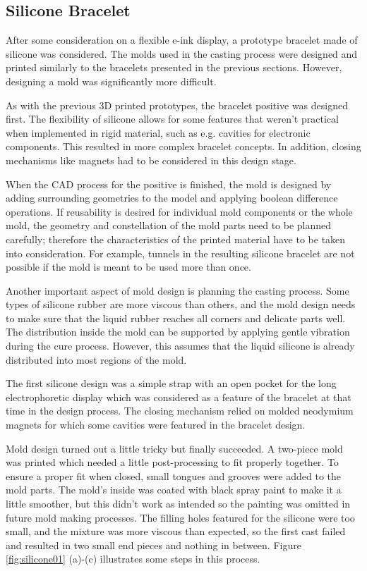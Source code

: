 \subsection{Silicone Bracelet}
After some consideration on a flexible e-ink display, a prototype brace\-let made of silicone was considered. The molds used in the casting process were designed and printed similarly to the bracelets presented in the previous sections. However, designing a mold was significantly more difficult.

As with the previous 3D printed prototypes, the bracelet positive was designed first. The flexibility of silicone allows for some features that weren't practical when implemented in rigid material, such as e.g. cavities for electronic components. This resulted in more complex bracelet concepts. In addition, closing mechanisms like magnets had to be considered in this design stage.

When the \ac{CAD} process for the positive is finished, the mold is designed by adding surrounding geometries to the model and applying boolean difference operations. If reusability is desired for individual mold components or the whole mold, the geometry and constellation of the mold parts need to be planned carefully; therefore the characteristics of the printed material have to be taken into consideration. For example, tunnels in the resulting silicone bracelet are not possible if the mold is meant to be used more than once.

Another important aspect of mold design is planning the casting process. Some types of silicone rubber are more viscous than others, and the mold design needs to make sure that the liquid rubber reaches all corners and delicate parts well. The distribution inside the mold can be supported by applying gentle vibration during the cure process. However, this assumes that the liquid silicone is already distributed into most regions of the mold.

The first silicone design was a simple strap with an open pocket for the long electrophoretic display which was considered as a feature of the bracelet at that time in the design process. The closing mechanism relied on molded neodymium magnets for which some cavities were featured in the bracelet design.

Mold design turned out a little tricky but finally succeeded. A two-piece mold was printed which needed a little post-processing to fit properly together. To ensure a proper fit when closed, small tongues and grooves were added to the mold parts. The mold's inside was coated with black spray paint to make it a little smoother, but this didn't work as intended so the painting was omitted in future mold making processes. The filling holes featured for the silicone were too small, and the mixture was more viscous than expected, so the first cast failed and resulted in two small end pieces and nothing in between. Figure \ref{fig:silicone01} (a)-(c) illustrates some steps in this process.

